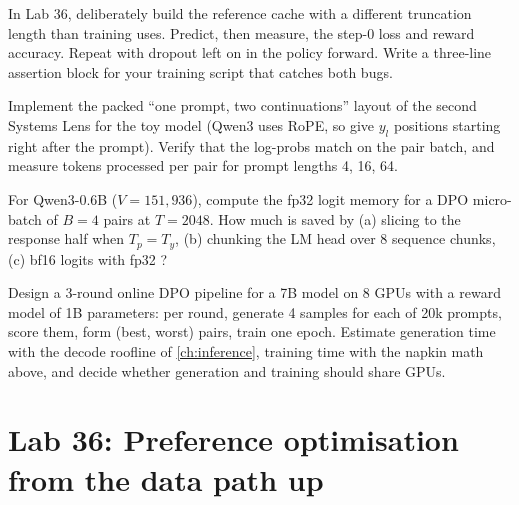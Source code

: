 \begin{exercise}
In Lab 36, deliberately build the reference cache with a different truncation length than training
uses. Predict, then measure, the step-0 loss and reward accuracy. Repeat with dropout left on in
the policy forward. Write a three-line assertion block for your training script that catches
both bugs.
\end{exercise}

\begin{exercise}
Implement the packed ``one prompt, two continuations'' layout of the second Systems Lens for the toy
model (Qwen3 uses RoPE, so give $y_l$ positions starting right after the prompt). Verify that the
log-probs match  on the pair batch, and measure tokens processed per pair
for prompt lengths 4, 16, 64.
\end{exercise}

\begin{exercise}
For Qwen3-0.6B ($V=151{,}936$), compute the fp32 logit memory for a DPO micro-batch of $B=4$ pairs
at $T=2048$. How much is saved by (a) slicing to the response half when $T_p=T_y$, (b) chunking the
LM head over 8 sequence chunks, (c) bf16 logits with fp32 ?
\end{exercise}

\begin{exercise}
Design a 3-round online DPO pipeline for a 7B model on 8 GPUs with a reward model of 1B parameters:
per round, generate 4 samples for each of 20k prompts, score them, form (best, worst) pairs, train one epoch.
Estimate generation time with the decode roofline of \cref{ch:inference}, training time with
the napkin math above, and decide whether generation and training should share GPUs.
\end{exercise}

\section{Lab 36: Preference optimisation from the data path up}\label{sec:dpo:lab}

